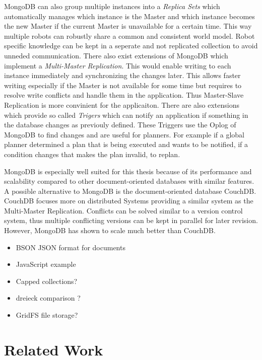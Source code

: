 \documentclass[a4paper,11pt]{article}
\begin{document}
 MongoDB can also group multiple
instances into a \emph{Replica Sets} which automatically manages which
instance is the Master and which instance becomes the new Master if
the current Master is unavailable for a certain time. This way
multiple robots can robustly share a common and consistent world
model. Robot specific knowledge can be kept in a seperate and not
replicated collection to avoid unneded communication. There also exist
extensions of MongoDB which implement a \emph{Multi-Master
  Replication}. This would enable writing to each instance immediately
and synchronizing the changes later.  This allows faster
writing especially if the Master is not available for some time but
requires to resolve write conflicts and handle them in the
application. Thus Master-Slave Replication is more convinient for the
applicaiton.
%
There are also extensions which provide so called \emph{Trigers} which
can notify an application if something in the database changes as
previouly defined.  These Triggers use the Oplog of
MongoDB to find changes and are useful for planners. For example if a
global planner determined a plan that is being executed and wants to
be notified, if a condition changes that makes the plan invalid, to
replan.

MongoDB is especially well suited for this thesis because of its
performance and scalability compared to other document-oriented
databases with similar features. A possible alternative to MongoDB is
the document-oriented database CouchDB. CouchDB
focuses more on distributed Systems providing a similar system as the
Multi-Master Replication. Conflicts can be solved similar to a version
control system, thus multiple conflicting versions can be kept in
parallel for later revision. However, MongoDB has shown to scale much better than CouchDB.



\begin{itemize}
\item BSON JSON format for documents
\item JavaScript example
\item Capped collections?
\item dreieck comparison ?
\item GridFS file storage?
\end{itemize}

\section{Related Work}
\label{sec:related}
\end{document}

